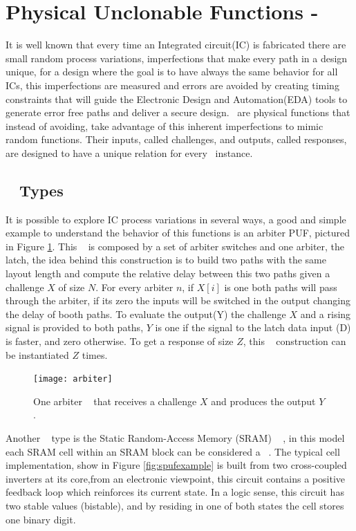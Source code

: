 \section{Physical Unclonable Functions - \pufs~}
\label{sec:pufs}
It is well known that every time an Integrated circuit(IC) is fabricated there are small random process variations, imperfections that make every path in a design unique, for a design where the goal is to have always the same behavior for all ICs, this imperfections are measured and errors are avoided by creating timing constraints that will guide the Electronic Design and Automation(EDA) tools to  generate error free paths and deliver a secure design. \pufs~are physical functions that instead of avoiding, take advantage of this inherent imperfections to mimic random functions. Their inputs, called challenges, and outputs, called responses, are designed to have a unique relation for every \puf~instance. 

\subsection{\puf~ Types}
It is possible to explore IC process variations in several ways\cite{DBLP:phdbasesearchMaes12}, a good and simple example to understand the behavior of this functions is an arbiter PUF, pictured in Figure \ref{fig:arbiterpuf}.
This \puf~ is composed by a set of arbiter switches and  one arbiter, the latch, the idea behind this construction is to build two paths with the same layout length and compute the relative delay between this two paths given a challenge $X$ of size $N$.  For every arbiter $n$, if $X[i]$  is one both paths will pass through the arbiter, if its zero the inputs will be switched in the output  changing the delay of booth paths. To evaluate the output(Y) the challenge $X$ and a rising signal is provided to both paths, $Y$ is one if the signal to the latch data input (D) is faster, and zero otherwise. To get a response of size $Z$, this \puf~ construction  can be instantiated $Z$ times.

\begin{figure}[!ht]
	\centering
	\texttt{[image: arbiter]}
	\caption{One arbiter \puf~ that receives a challenge $X$ and produces the output $Y$.}
	\label{fig:arbiterpuf}
\end{figure}

Another \puf~ type is the Static Random-Access Memory (SRAM) \puf~ \cite{Leest2012}, in this model each SRAM cell within an SRAM block can be considered a \puf~. The typical cell implementation, show in Figure \ref{fig:spufexample} is built from two cross-coupled inverters at its core,from an electronic viewpoint, this circuit contains a positive feedback loop which reinforces its current state. In a logic sense, this circuit has two stable values (bistable), and by residing in one of both states the cell stores one binary digit.

